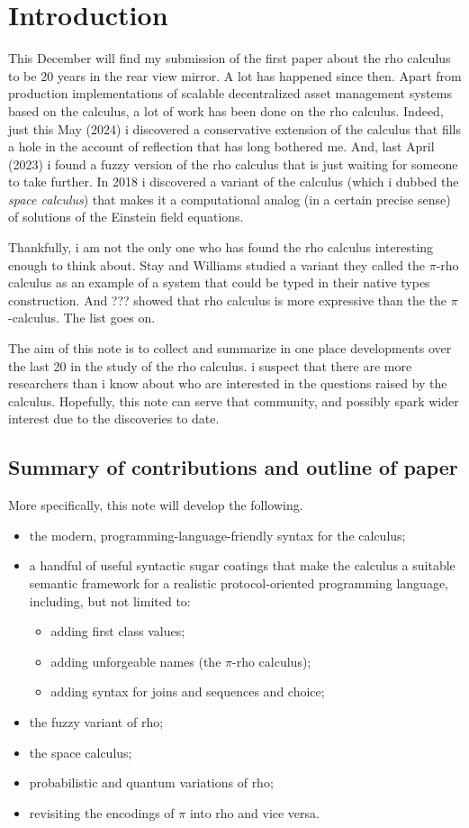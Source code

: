 \section{Introduction}\label{sec:introduction} %
This December will find my submission of the first paper about the rho
calculus to be 20 years in the rear view mirror. A lot has happened
since then. Apart from production implementations of scalable
decentralized asset management systems based on the calculus, a lot of
work has been done on the rho calculus. Indeed, just this May (2024) i
discovered a conservative extension of the calculus that fills a hole
in the account of reflection that has long bothered me. And, last
April (2023) i found a fuzzy version of the rho calculus that is just
waiting for someone to take further. In 2018 i discovered a variant of
the calculus (which i dubbed the \emph{space calculus}) that makes it
a computational analog (in a certain precise sense) of solutions of
the Einstein field equations.

Thankfully, i am not the only one who has found the rho calculus
interesting enough to think about. Stay and Williams studied a variant
they called the $\pi$-rho calculus as an example of a system that could
be typed in their native types construction. And ??? showed that rho
calculus is more expressive than the the $\pi$-calculus. The list goes on.

The aim of this note is to collect and summarize in one place
developments over the last 20 in the study of the rho calculus. i
suspect that there are more researchers than i know about who are
interested in the questions raised by the calculus. Hopefully, this
note can serve that community, and possibly spark wider interest due to
the discoveries to date.

\subsection{Summary of contributions and outline of paper}
More specifically, this note will develop the following.
\begin{itemize}
  \item the modern, programming-language-friendly syntax for the calculus;
  \item a handful of useful syntactic sugar coatings that make the
    calculus a suitable semantic framework for a realistic
    protocol-oriented programming language, including, but not limited
    to:
    \begin{itemize}
      \item adding first class values;
      \item adding unforgeable names (the $\pi$-rho calculus);
      \item adding syntax for joins and sequences and choice;
    \end{itemize}
  \item the fuzzy variant of rho;
  \item the space calculus;
  \item probabilistic and quantum variations of rho;
  \item revisiting the encodings of $\pi$ into rho and vice versa.
\end{itemize}

